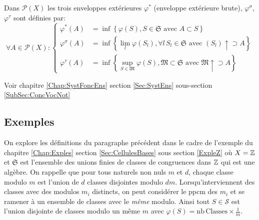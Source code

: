 \begin{defin} \label{Def:enveloppesFoncEns}
 Dans $\mathcal{P}(X)$ les trois enveloppes extérieures $\varphi^*$ (enveloppe extérieure brute), $\varphi^\sigma$, $\varphi^\tau$ sont définies par:
\begin{displaymath}
 \forall A \in  \mathcal{P}(X):
 \left\lbrace
 \begin{aligned}
    \varphi^*(A) &= \inf \left\lbrace \varphi(S), S \in \mathfrak{S} \text{ avec } A \subset S \right\rbrace \\
    \varphi^\sigma(A) &= \inf \left\lbrace \lim_{l}  \varphi(S_l), \forall l \, S_l\in \mathfrak{S} \text{ avec } (S_l) \uparrow \supset A \right\rbrace \\
    \varphi^\tau(A) &= \inf \left\lbrace \sup_{S \in \mathfrak{M}} \varphi(S), \mathfrak{M} \subset \mathfrak{S} \text{ avec } \mathfrak{M}\uparrow \supset A\right\rbrace
 \end{aligned}
 \right.
\end{displaymath}
\end{defin}

Voir chapitre \ref{Chap:SystFoncEns} section \ref{Sec:SystEns} sous-section \ref{SubSec:ConcVocNot}

\subsection{Exemples}\label{SubSec:ExplesEnvlpArith}
On explore les définitions du paragraphe précédent dans le cadre de l'exemple du chapitre \ref{Chap:Exples} section \ref{Sec:CellulesBases} sous section \ref{ExpleZ} où $X= \mathbb{Z}$ et $\mathfrak{S}$ est l'ensemble des unions finies de classes de congruences dans $\mathbb{Z}$ qui est une algèbre.\newline
On rappelle que pour tous naturels non nuls $m$ et $d$, chaque classe modulo $m$ est l'union de $d$ classes disjointes modulo $dm$. Lorsqu'interviennent des classes avec des modulos $m_i$ distincts, on peut considérer le ppcm des $m_i$ et se ramener à un ensemble de classes avec le \emph{même} modulo. Ainsi tout $S\in \mathcal{S}$ est l'union disjointe de classes modulo un même $m$ avec $\varphi(S) = \mathrm{nb\, Classes}\times \frac{1}{m}$.

